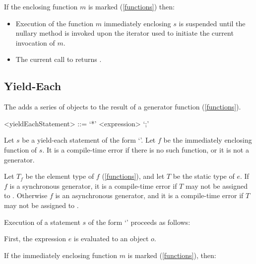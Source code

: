 \documentclass[makeidx]{article}
\begin{document}
{\LMHash{}%
If the enclosing function $m$ is marked \code{\SYNC*} (\ref{functions}) then:

\begin{itemize}
\item
  Execution of the function $m$ immediately enclosing $s$ is suspended
  until the nullary method  is invoked upon
  the iterator used to initiate the current invocation of $m$.
\item
  The current call to  returns \TRUE.
\end{itemize}


\subsection{Yield-Each}

\LMHash{}%
The  adds a series of objects to
the result of a generator function
(\ref{functions}).

\begin{grammar}
<yieldEachStatement> ::= \YIELD{} `*' <expression> `;'
\end{grammar}

\LMHash{}%
Let $s$ be a yield-each statement of the form `'.
Let $f$ be the immediately enclosing function of $s$.
It is a compile-time error if there is no such function,
or it is not a generator.

\LMHash{}%
Let $T_f$ be the element type of $f$
(\ref{functions}),
and let $T$ be the static type of $e$.
If $f$ is a synchronous generator,
it is a compile-time error if $T$ may not be assigned to
.
Otherwise $f$ is an asynchronous generator,
and it is a compile-time error if $T$ may not be assigned to
.

\LMHash{}%
Execution of a statement $s$ of the form `'
proceeds as follows:

\LMHash{}%
First, the expression $e$ is evaluated to an object $o$.

\LMHash{}%
If the immediately enclosing function $m$ is marked \code{\SYNC*}
(\ref{functions}),
then:

}
\end{document}

